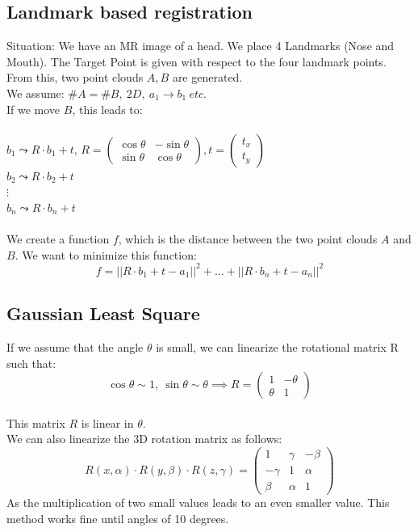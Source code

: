 \documentclass{exerciseBlue}
\begin{document}
\subsection{Landmark based registration}
Situation: We have an MR image of a head. We place 4 Landmarks (Nose and Mouth). The Target Point is given with respect to the four landmark points. \\
From this, two point clouds $A,B$ are generated.\\
We assume: $\#A = \#B, \ 2D, \ a_1\rightarrow b_1 \ etc.$\\
If we move $B$, this leads to:\\\\
$b_1 \leadsto R\cdot b_1 + t$, $R = \begin{pmatrix}
	\cos \theta & -\sin\theta\\
	\sin\theta & \cos\theta
\end{pmatrix}, t = \begin{pmatrix}
t_x\\
t_y
\end{pmatrix}$\\
$b_2 \leadsto R\cdot b_2 + t$\\
$\vdots$\\
$b_n \leadsto R\cdot b_n + t$\\\\
We create a function $f$, which is the distance between the two point clouds $A$ and $B$. We want to minimize this function:
$$f = ||R\cdot b_1 + t - a_1||^2+\dots+||R\cdot b_n + t - a_n||^2$$
\subsection{Gaussian Least Square}
If we assume that the angle $\theta$ is small, we can linearize the rotational matrix R such that:
$$\cos \theta \sim 1, \ \sin \theta \sim \theta \implies R = \begin{pmatrix}
1 & -\theta\\
\theta & 1
\end{pmatrix}$$\\
This matrix $R$ is linear in $\theta$.\\
We can also linearize the 3D rotation matrix as follows:
$$R(x,\alpha)\cdot R(y,\beta)\cdot R(z,\gamma) = \begin{pmatrix}
1 & \gamma & -\beta\\
-\gamma & 1 & \alpha\\
\beta & \alpha & 1
\end{pmatrix}$$
As the multiplication of two small values leads to an even smaller value. This method works fine until angles of 10 degrees.
\end{document}
